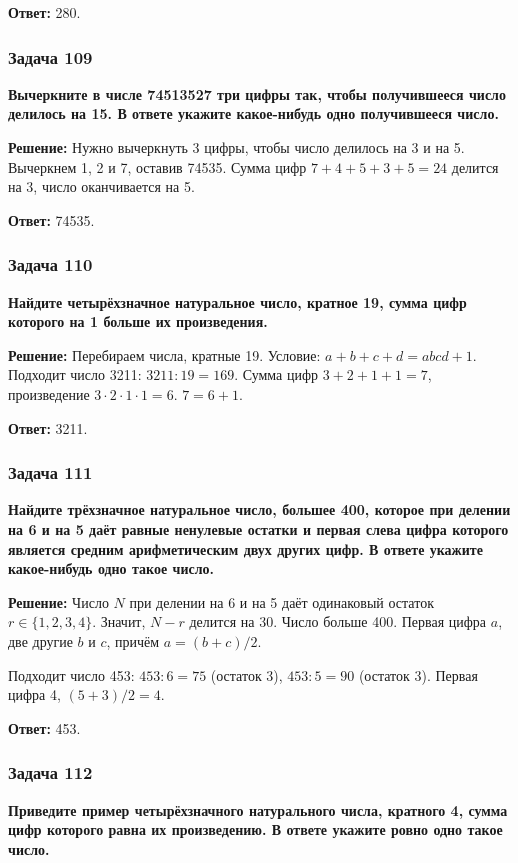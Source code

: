 \documentclass[12pt, a4paper]{article}
\begin{document}
\textbf{Ответ:} 280.

\subsubsection*{Задача 109}
\textbf{Вычеркните в числе 74513527 три цифры так, чтобы получившееся число делилось на 15. В ответе укажите какое-нибудь одно получившееся число.}

\textbf{Решение:}
Нужно вычеркнуть 3 цифры, чтобы число делилось на 3 и на 5. Вычеркнем 1, 2 и 7, оставив 74535. Сумма цифр $7+4+5+3+5=24$ делится на 3, число оканчивается на 5.

\textbf{Ответ:} 74535.

\subsubsection*{Задача 110}
\textbf{Найдите четырёхзначное натуральное число, кратное 19, сумма цифр которого на 1 больше их произведения.}

\textbf{Решение:}
Перебираем числа, кратные 19. Условие: $a+b+c+d = abcd + 1$.
Подходит число 3211: $3211 : 19 = 169$. Сумма цифр $3+2+1+1=7$, произведение $3 \cdot 2 \cdot 1 \cdot 1 = 6$. $7 = 6+1$.

\textbf{Ответ:} 3211.

\subsubsection*{Задача 111}
\textbf{Найдите трёхзначное натуральное число, большее 400, которое при делении на 6 и на 5 даёт равные ненулевые остатки и первая слева цифра которого является средним арифметическим двух других цифр. В ответе укажите какое-нибудь одно такое число.}

\textbf{Решение:}
Число $N$ при делении на 6 и на 5 даёт одинаковый остаток $r \in \{1,2,3,4\}$. Значит, $N-r$ делится на 30. Число больше 400. Первая цифра $a$, две другие $b$ и $c$, причём $a = (b+c)/2$.

Подходит число 453: $453 : 6 = 75$ (остаток 3), $453 : 5 = 90$ (остаток 3). Первая цифра 4, $(5+3)/2 = 4$.

\textbf{Ответ:} 453.

\subsubsection*{Задача 112}
\textbf{Приведите пример четырёхзначного натурального числа, кратного 4, сумма цифр которого равна их произведению. В ответе укажите ровно одно такое число.}
\end{document}

